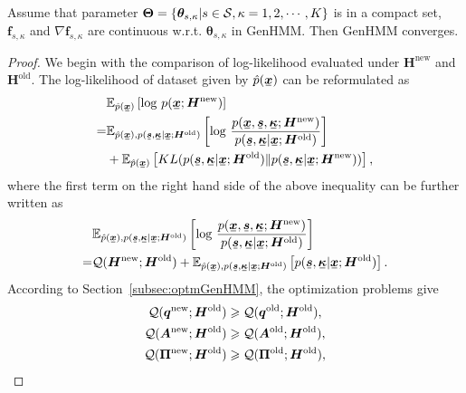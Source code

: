 \begin{proposition}\label{proposition1}
  Assume that parameter $\bm{\Theta} = \left\{ \bm{\theta}_{s,\kappa}| s\in \mathcal{S}, \kappa=1, 2, \cdots, K \right\}$ is in a compact set,  $\bm{f}_{s,\kappa}$ and  ${\nabla\bm{f}_{s,\kappa}}$ are continuous w.r.t. ${\bm\theta}_{s,\kappa}$ in GenHMM. Then GenHMM converges.
\end{proposition}

\begin{proof}
  We begin with the comparison of log-likelihood evaluated under $\bm{H}^{\mathrm{new}}$ and $\bm{H}^{\mathrm{old}}$. The log-likelihood of dataset given by $\hat{p}(\ubm{x})$ can be reformulated as
  \begin{align*}
    &\EE_{\hat{p}(\ubm{x})}\left[ \log\,p(\ubm{x};\bm{H}^{\mathrm{new}}) \right] \nonumber \\
    =& \EE_{\hat{p}(\ubm{x}),p(\ubm{s},\ubm{\kappa}| \ubm{x}; \bm{H}^{\mathrm{old}})}\left[ \log\,\frac{p(\ubm{x}, \ubm{s}, \ubm{\kappa}; \bm{H}^{\mathrm{new}})}{p(\ubm{s}, \ubm{\kappa}|\ubm{x}; \bm{H}^{\mathrm{old}})}\right]  \nonumber \\
    & +\EE_{\hat{p}(\ubm{x})}\left[ KL(p(\ubm{s}, \ubm{\kappa}|\ubm{x}; \bm{H}^{\mathrm{old}})\|p(\ubm{s}, \ubm{\kappa}|\ubm{x}; \bm{H}^{\mathrm{new}})) \right],
  \end{align*}
  where the first term on the right hand side of the above inequality can be further written as
  \begin{align*}
    &\EE_{\hat{p}(\ubm{x}),p(\ubm{s},\ubm{\kappa}| \ubm{x}; \bm{H}^{\mathrm{old}})}\left[ \log\,\frac{p(\ubm{x}, \ubm{s}, \ubm{\kappa}; \bm{H}^{\mathrm{new}})}{p(\ubm{s}, \ubm{\kappa}|\ubm{x}; \bm{H}^{\mathrm{old}})}\right] \nonumber \\
    = &\Qq(\bm{H}^{\mathrm{new}}; \bm{H}^{\mathrm{old}}) + \EE_{\hat{p}(\ubm{x}),p(\ubm{s},\ubm{\kappa}| \ubm{x}; \bm{H}^{\mathrm{old}})}\left[p(\ubm{s}, \ubm{\kappa}|\ubm{x}; \bm{H}^{\mathrm{old}})\right].
  \end{align*}
  According to Section~\ref{subsec:optmGenHMM}, the optimization problems give
  \begin{align*}
    \Qq(\bm{q}^{\mathrm{new}}; \bm{H}^{\mathrm{old}}) &\geq \Qq(\bm{q}^{\mathrm{old}}; \bm{H}^{\mathrm{old}}),\nonumber \\
    \Qq(\bm{A}^{\mathrm{new}}; \bm{H}^{\mathrm{old}}) &\geq \Qq(\bm{A}^{\mathrm{old}}; \bm{H}^{\mathrm{old}}),\nonumber \\
    \Qq(\bm{\Pi}^{\mathrm{new}}; \bm{H}^{\mathrm{old}}) &\geq \Qq(\bm{\Pi}^{\mathrm{old}}; \bm{H}^{\mathrm{old}}), \nonumber \\

\end{align*}
\end{proof}

